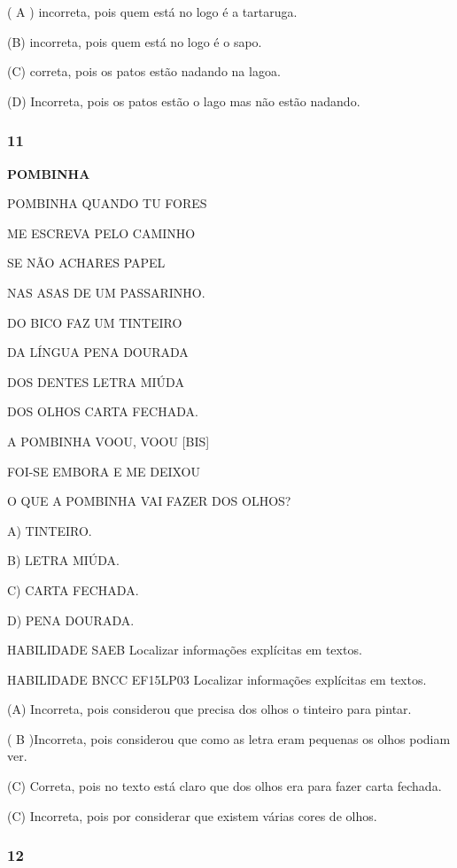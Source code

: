 ( A ) incorreta, pois quem está no logo é a tartaruga.

(B) incorreta, pois quem está no logo é o sapo.

(C) correta, pois os patos estão nadando na lagoa.

(D) Incorreta, pois os patos estão o lago mas não estão nadando.

\subsubsection{11 }\label{section-83}

\textbf{POMBINHA}

POMBINHA QUANDO TU FORES

ME ESCREVA PELO CAMINHO

SE NÃO ACHARES PAPEL

NAS ASAS DE UM PASSARINHO.

DO BICO FAZ UM TINTEIRO

DA LÍNGUA PENA DOURADA

DOS DENTES LETRA MIÚDA

DOS OLHOS CARTA FECHADA.

A POMBINHA VOOU, VOOU {[}BIS{]}

FOI-SE EMBORA E ME DEIXOU

O QUE A POMBINHA VAI FAZER DOS OLHOS?

A) TINTEIRO.

B) LETRA MIÚDA.

C) CARTA FECHADA.

D) PENA DOURADA.

HABILIDADE SAEB Localizar informações explícitas em textos.

HABILIDADE BNCC EF15LP03 Localizar informações explícitas em textos.

(A) Incorreta, pois considerou que precisa dos olhos o tinteiro para
pintar.

( B )Incorreta, pois considerou que como as letra eram pequenas os olhos
podiam ver.

(C) Correta, pois no texto está claro que dos olhos era para fazer carta
fechada.

(C) Incorreta, pois por considerar que existem várias cores de
olhos.\protect\hypertarget{_heading=h.xyn2rjyn0l4h}{}{}

\subsubsection{12}\label{section-84}

